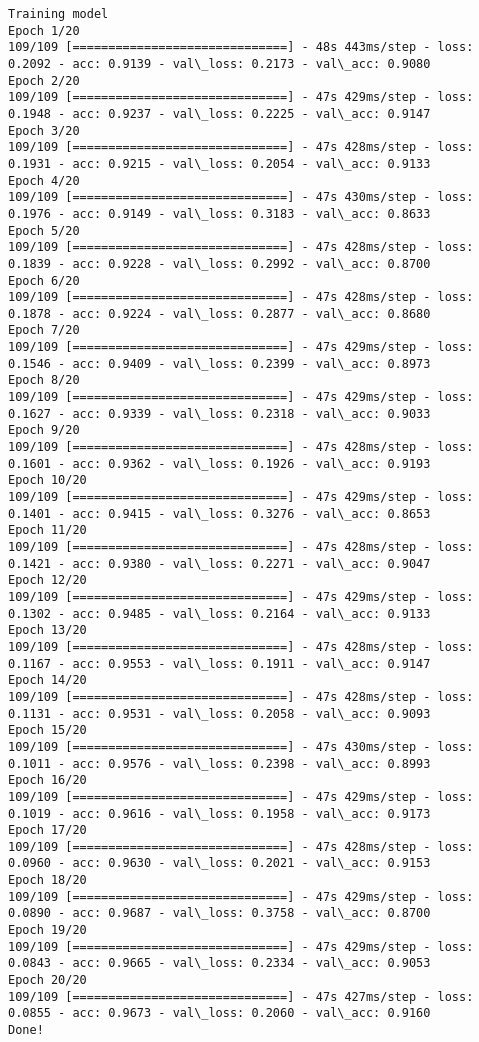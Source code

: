 \documentclass[11pt]{article}
\begin{document}
    \begin{Verbatim}[commandchars=\\\{\}]
Training model
Epoch 1/20
109/109 [==============================] - 48s 443ms/step - loss: 0.2092 - acc: 0.9139 - val\_loss: 0.2173 - val\_acc: 0.9080
Epoch 2/20
109/109 [==============================] - 47s 429ms/step - loss: 0.1948 - acc: 0.9237 - val\_loss: 0.2225 - val\_acc: 0.9147
Epoch 3/20
109/109 [==============================] - 47s 428ms/step - loss: 0.1931 - acc: 0.9215 - val\_loss: 0.2054 - val\_acc: 0.9133
Epoch 4/20
109/109 [==============================] - 47s 430ms/step - loss: 0.1976 - acc: 0.9149 - val\_loss: 0.3183 - val\_acc: 0.8633
Epoch 5/20
109/109 [==============================] - 47s 428ms/step - loss: 0.1839 - acc: 0.9228 - val\_loss: 0.2992 - val\_acc: 0.8700
Epoch 6/20
109/109 [==============================] - 47s 428ms/step - loss: 0.1878 - acc: 0.9224 - val\_loss: 0.2877 - val\_acc: 0.8680
Epoch 7/20
109/109 [==============================] - 47s 429ms/step - loss: 0.1546 - acc: 0.9409 - val\_loss: 0.2399 - val\_acc: 0.8973
Epoch 8/20
109/109 [==============================] - 47s 429ms/step - loss: 0.1627 - acc: 0.9339 - val\_loss: 0.2318 - val\_acc: 0.9033
Epoch 9/20
109/109 [==============================] - 47s 428ms/step - loss: 0.1601 - acc: 0.9362 - val\_loss: 0.1926 - val\_acc: 0.9193
Epoch 10/20
109/109 [==============================] - 47s 429ms/step - loss: 0.1401 - acc: 0.9415 - val\_loss: 0.3276 - val\_acc: 0.8653
Epoch 11/20
109/109 [==============================] - 47s 428ms/step - loss: 0.1421 - acc: 0.9380 - val\_loss: 0.2271 - val\_acc: 0.9047
Epoch 12/20
109/109 [==============================] - 47s 429ms/step - loss: 0.1302 - acc: 0.9485 - val\_loss: 0.2164 - val\_acc: 0.9133
Epoch 13/20
109/109 [==============================] - 47s 428ms/step - loss: 0.1167 - acc: 0.9553 - val\_loss: 0.1911 - val\_acc: 0.9147
Epoch 14/20
109/109 [==============================] - 47s 428ms/step - loss: 0.1131 - acc: 0.9531 - val\_loss: 0.2058 - val\_acc: 0.9093
Epoch 15/20
109/109 [==============================] - 47s 430ms/step - loss: 0.1011 - acc: 0.9576 - val\_loss: 0.2398 - val\_acc: 0.8993
Epoch 16/20
109/109 [==============================] - 47s 429ms/step - loss: 0.1019 - acc: 0.9616 - val\_loss: 0.1958 - val\_acc: 0.9173
Epoch 17/20
109/109 [==============================] - 47s 428ms/step - loss: 0.0960 - acc: 0.9630 - val\_loss: 0.2021 - val\_acc: 0.9153
Epoch 18/20
109/109 [==============================] - 47s 429ms/step - loss: 0.0890 - acc: 0.9687 - val\_loss: 0.3758 - val\_acc: 0.8700
Epoch 19/20
109/109 [==============================] - 47s 429ms/step - loss: 0.0843 - acc: 0.9665 - val\_loss: 0.2334 - val\_acc: 0.9053
Epoch 20/20
109/109 [==============================] - 47s 427ms/step - loss: 0.0855 - acc: 0.9673 - val\_loss: 0.2060 - val\_acc: 0.9160
Done!

    \end{Verbatim}
\end{document}
